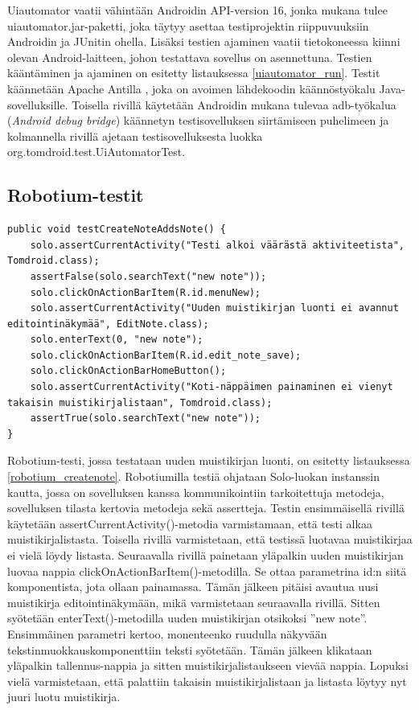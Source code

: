 Uiautomator vaatii vähintään Androidin API-version 16, jonka mukana tulee uiautomator.jar-paketti, joka täytyy asettaa testiprojektin riippuvuuksiin Androidin ja JUnitin ohella. Lisäksi testien ajaminen vaatii tietokoneessa kiinni olevan Android-laitteen, johon testattava sovellus on asennettuna. Testien kääntäminen ja ajaminen on esitetty listauksessa \ref{uiautomator_run}. Testit käännetään Apache Antilla \cite{ant}, joka on avoimen lähdekoodin käännöstyökalu Java-sovelluksille. Toisella rivillä käytetään Androidin mukana tulevaa adb-työkalua (\emph{Android debug bridge}) käännetyn testisovelluksen siirtämiseen puhelimeen ja kolmannella rivillä ajetaan testisovelluksesta luokka org.tomdroid.test.UiAutomatorTest.

\subsection{Robotium-testit}

\begin{lstlisting}[float,label=robotium_createnote,caption=Muistikirjan luontitesti Robotiumilla]
public void testCreateNoteAddsNote() {
	solo.assertCurrentActivity("Testi alkoi väärästä aktiviteetista", Tomdroid.class);
	assertFalse(solo.searchText("new note"));
	solo.clickOnActionBarItem(R.id.menuNew);
	solo.assertCurrentActivity("Uuden muistikirjan luonti ei avannut editointinäkymää", EditNote.class);
	solo.enterText(0, "new note");
	solo.clickOnActionBarItem(R.id.edit_note_save);
	solo.clickOnActionBarHomeButton();
	solo.assertCurrentActivity("Koti-näppäimen painaminen ei vienyt takaisin muistikirjalistaan", Tomdroid.class);
	assertTrue(solo.searchText("new note"));
}
\end{lstlisting}

Robotium-testi, jossa testataan uuden muistikirjan luonti, on esitetty listauksessa \ref{robotium_createnote}. Robotiumilla testiä ohjataan Solo-luokan instanssin kautta, jossa on sovelluksen kanssa kommunikointiin tarkoitettuja metodeja, sovelluksen tilasta kertovia metodeja sekä assertteja. Testin ensimmäisellä rivillä käytetään assertCurrentActivity()-metodia varmistamaan, että testi alkaa muistikirjalistasta. Toisella rivillä varmistetaan, että testissä luotavaa muistikirjaa ei vielä löydy listasta. Seuraavalla rivillä painetaan yläpalkin uuden muistikirjan luovaa nappia clickOnActionBarItem()-metodilla. Se ottaa parametrina id:n siitä komponentista, jota ollaan painamassa. Tämän jälkeen pitäisi avautua uusi muistikirja editointinäkymään, mikä varmistetaan seuraavalla rivillä. Sitten syötetään enterText()-metodilla uuden muistikirjan otsikoksi ''new note''. Ensimmäinen parametri kertoo, monenteenko ruudulla näkyvään tekstinmuokkauskomponenttiin teksti syötetään. Tämän jälkeen klikataan yläpalkin tallennus-nappia ja sitten muistikirjalistaukseen vievää nappia. Lopuksi vielä varmistetaan, että palattiin takaisin muistikirjalistaan ja listasta löytyy nyt juuri luotu muistikirja.

